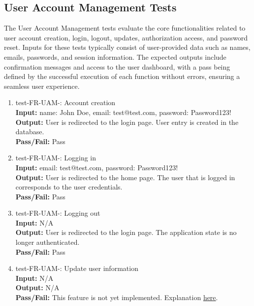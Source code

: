 \documentclass[12pt, titlepage]{article}
\begin{document}
\subsection{User Account Management Tests}
The User Account Management tests evaluate the core functionalities related to user 
account creation, login, logout, updates, authorization access, and password reset. Inputs 
for these tests typically consist of user-provided data such as names, emails, passwords, 
and session information. The expected outputs include confirmation messages and access to 
the user dashboard, with a pass being defined by the successful execution of each function 
without errors, ensuring a seamless user experience.

\begin{enumerate}
\item test-FR-UAM-: Account creation\\\label{test-FR-UAM-1}
  \textbf{Input:} name: John Doe, email: test@test.com, password: Password123!\\
  \textbf{Output:} User is redirected to the login page. User entry is created
  in the database.\\
  \textbf{Pass/Fail:} Pass\\
\item test-FR-UAM-: Logging in\\
  \textbf{Input:} email: test@test.com, password: Password123!\\
  \textbf{Output:} User is redirected to the home page. The user that is logged
  in corresponds to the user credentials.\\
  \textbf{Pass/Fail:} Pass\\
\item test-FR-UAM-: Logging out\\
  \textbf{Input:} N/A\\
  \textbf{Output:} User is redirected to the login page. The application state
  is no longer authenticated.\\
  \textbf{Pass/Fail:} Pass\\
\item test-FR-UAM-: Update user information\\
  \textbf{Input:} N/A\\
  \textbf{Output:} N/A\\
  \textbf{Pass/Fail:} This feature is not yet implemented. Explanation
  \href{https://github.com/PlutosCapstone/Plutos/issues/266#issuecomment-2779557067}{here}.\\

\end{enumerate}
\end{document}
